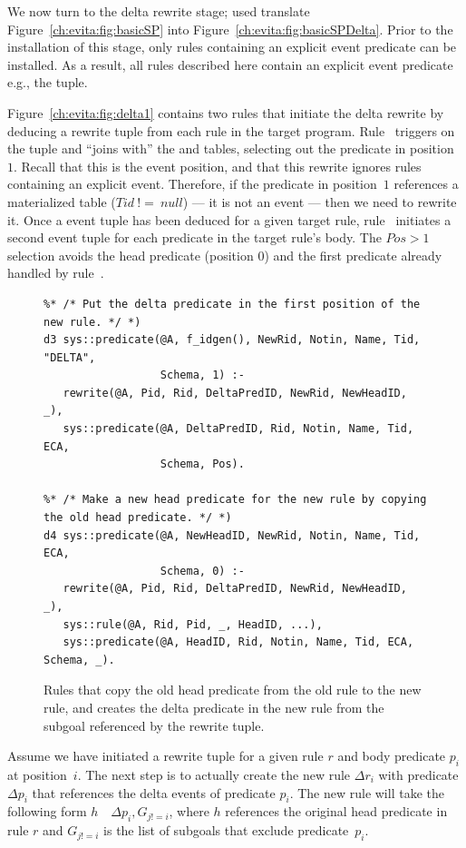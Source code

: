We now turn to the delta rewrite \OVERLOG stage; used translate
Figure~\ref{ch:evita:fig:basicSP} into Figure~\ref{ch:evita:fig:basicSPDelta}.
Prior to the installation of this stage, only rules containing an explicit
event predicate can be installed.  As a result, all rules described here
contain an explicit event predicate e.g., the  tuple.

Figure~\ref{ch:evita:fig:delta1} contains two rules that initiate the delta
rewrite by deducing a rewrite tuple from each rule in the target program.
Rule~ triggers on the  tuple and ``joins with''
the  and  tables, selecting out the predicate in
position~$1$.  Recall that this is the event position, and that this rewrite
ignores rules containing an explicit event.  Therefore, if the predicate in
position~$1$ references a materialized table ($Tid\ !=\ null$) --- it is not an
event --- then we need to rewrite it.  Once a  event tuple has been
deduced for a given target rule, rule~ initiates a second 
event tuple for each predicate in the target rule's body.  The $Pos > 1$
selection avoids the head predicate (position $0$) and the first predicate
already handled by rule~.

\begin{figure}
\ssp
\centering
\begin{lstlisting}
%* /* Put the delta predicate in the first position of the new rule. */ *)
d3 sys::predicate(@A, f_idgen(), NewRid, Notin, Name, Tid, "DELTA", 
                  Schema, 1) :-
   rewrite(@A, Pid, Rid, DeltaPredID, NewRid, NewHeadID, _),
   sys::predicate(@A, DeltaPredID, Rid, Notin, Name, Tid, ECA, 
                  Schema, Pos).

%* /* Make a new head predicate for the new rule by copying the old head predicate. */ *)
d4 sys::predicate(@A, NewHeadID, NewRid, Notin, Name, Tid, ECA, 
                  Schema, 0) :-
   rewrite(@A, Pid, Rid, DeltaPredID, NewRid, NewHeadID, _),
   sys::rule(@A, Rid, Pid, _, HeadID, ...),
   sys::predicate(@A, HeadID, Rid, Notin, Name, Tid, ECA, Schema, _).
\end{lstlisting}
\caption{\label{ch:evita:fig:delta2}Rules that copy the old head predicate from the old rule
to the new rule, and creates the delta predicate in the new rule from the subgoal referenced
by the rewrite tuple.}
\end{figure}

Assume we have initiated a rewrite tuple for a given rule $r$ and body
predicate $p_i$ at position~$i$.  The next step is to actually create the new
rule $\Delta r_i$ with predicate $\Delta p_i$ that references the delta events of
predicate $p_i$.  The new rule will take the following form $h$~\ol{:-}~$\Delta
p_i, G_{j!=i}$, where $h$ references the original head predicate in rule $r$
and $G_{j!=i}$ is the list of subgoals that exclude predicate~$p_i$.

